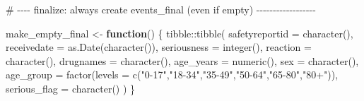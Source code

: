 \documentclass[
  letterpaper,
  DIV=11,
  numbers=noendperiod]{scrartcl}
\newenvironment{Shaded}{\begin{snugshade}}{\end{snugshade}}
\newcommand{\AttributeTok}[1]{\textcolor[rgb]{0.40,0.45,0.13}{#1}}
\newcommand{\CommentTok}[1]{\textcolor[rgb]{0.37,0.37,0.37}{#1}}
\newcommand{\ControlFlowTok}[1]{\textcolor[rgb]{0.00,0.23,0.31}{\textbf{#1}}}
\newcommand{\FunctionTok}[1]{\textcolor[rgb]{0.28,0.35,0.67}{#1}}
\newcommand{\NormalTok}[1]{\textcolor[rgb]{0.00,0.23,0.31}{#1}}
\newcommand{\OtherTok}[1]{\textcolor[rgb]{0.00,0.23,0.31}{#1}}
\newcommand{\SpecialCharTok}[1]{\textcolor[rgb]{0.37,0.37,0.37}{#1}}
\newcommand{\StringTok}[1]{\textcolor[rgb]{0.13,0.47,0.30}{#1}}
\begin{document}
\begin{Shaded}
\begin{Highlighting}[]
\CommentTok{\# {-}{-}{-}{-} finalize: always create events\_final (even if empty) {-}{-}{-}{-}{-}{-}{-}{-}{-}{-}{-}{-}{-}{-}{-}{-}{-}{-}}

\NormalTok{make\_empty\_final }\OtherTok{\textless{}{-}} \ControlFlowTok{function}\NormalTok{() \{}
\NormalTok{  tibble}\SpecialCharTok{::}\FunctionTok{tibble}\NormalTok{(}
    \AttributeTok{safetyreportid =} \FunctionTok{character}\NormalTok{(),}
    \AttributeTok{receivedate    =} \FunctionTok{as.Date}\NormalTok{(}\FunctionTok{character}\NormalTok{()),}
    \AttributeTok{seriousness    =} \FunctionTok{integer}\NormalTok{(),}
    \AttributeTok{reaction       =} \FunctionTok{character}\NormalTok{(),}
    \AttributeTok{drugnames      =} \FunctionTok{character}\NormalTok{(),}
    \AttributeTok{age\_years      =} \FunctionTok{numeric}\NormalTok{(),}
    \AttributeTok{sex            =} \FunctionTok{character}\NormalTok{(),}
    \AttributeTok{age\_group      =} \FunctionTok{factor}\NormalTok{(}\AttributeTok{levels =} \FunctionTok{c}\NormalTok{(}\StringTok{"0{-}17"}\NormalTok{,}\StringTok{"18{-}34"}\NormalTok{,}\StringTok{"35{-}49"}\NormalTok{,}\StringTok{"50{-}64"}\NormalTok{,}\StringTok{"65{-}80"}\NormalTok{,}\StringTok{"80+"}\NormalTok{)),}
    \AttributeTok{serious\_flag   =} \FunctionTok{character}\NormalTok{()}
\NormalTok{  )}
\NormalTok{\}}


\end{Highlighting}
\end{Shaded}
\end{document}

